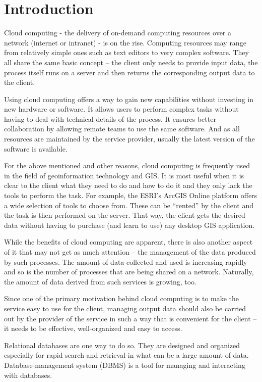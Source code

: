 \chapter{Introduction}
\label{1-introduction}

Cloud computing - the delivery of on-demand computing resources over a
network (internet or intranet) - is on the rise. Computing resources
may range from relatively simple ones such as text editors to very
complex software. They all share the same basic concept – the client
only needs to provide input data, the process itself runs on a server
and then returns the corresponding output data to the client.

Using cloud computing offers a way to gain new capabilities without
investing in new hardware or software. It allows users to perform
complex tasks without having to deal with technical details of the
process. It ensures better collaboration by allowing remote teams to
use the same software. And as all resources are maintained by the
service provider, usually the latest version of the software is
available.

For the above mentioned and other reasons, cloud computing is
frequently used in the field of geoinformation technology and GIS. It
is most useful when it is clear to the client what they need to do and
how to do it and they only lack the tools to perform the task. For
example, the ESRI’s ArcGIS Online platform offers a wide selection of
tools to choose from. These can be “rented” by the client and the task
is then performed on the server. That way, the client gets the desired
data without having to purchase (and learn to use) any desktop GIS
application.

While the benefits of cloud computing are apparent, there is also
another aspect of it that may not get as much attention – the
management of the data produced by such processes. The amount of data
collected and used is increasing rapidly and so is the number of
processes that are being shared on a network. Naturally, the amount of
data derived from such services is growing, too.

Since one of the primary motivation behind cloud computing is to make
the service easy to use for the client, managing output data should
also be carried out by the provider of the service in such a way that
is convenient for the client – it needs to be effective,
well-organized and easy to access.

Relational databases are one way to do so. They are designed and
organized especially for rapid search and retrieval in what can be a
large amount of data. Database-management system (DBMS) is a tool for
managing and interacting with databases.
	

